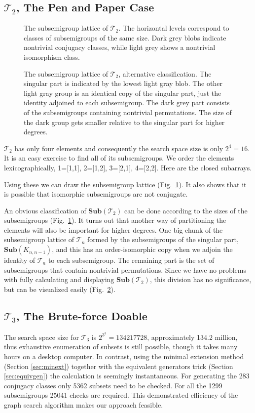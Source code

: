 \documentclass{amsart}
\newcommand{\cT}{{\mathcal T}}
\newcommand{\Sub}{\mathbf{Sub}}
\theoremstyle{plain}
\theoremstyle{definition}
\begin{document}
\subsection{$\cT_2$, The Pen and Paper Case}
\begin{figure}[t]

\caption{The subsemigroup lattice of $\cT_2$. The horizontal levels correspond to classes of subsemigroups of the same size.  Dark grey blobs indicate nontrivial conjugacy classes, while light grey shows a nontrivial isomorphism class.}
\label{fig:T2subs}
\end{figure}
\begin{figure}

\caption{The subsemigroup lattice of $\cT_2$, alternative classification. The singular part is indicated by the lowest light gray blob. The other light gray group is an identical copy of the singular part, just the identity adjoined to each subsemigroup. The dark grey part consists of the subsemigroups containing nontrivial permutations. The size of the dark group gets smaller relative to the singular part for higher degrees.}
\label{fig:T2subsAlt}
\end{figure}
$\cT_2$ has only four elements and consequently the search space size is only $2^4=16$.
It is an easy exercise to find all of its subsemigroups. 
We order the elements lexicographically, 1=[1,1], 2=[1,2], 3=[2,1], 4=[2,2]. Here are the closed subarrays.

Using these we can draw the subsemigroup lattice (Fig.\ \ref{fig:T2subs}).
It also shows that it is possible that isomorphic subsemigroups are not conjugate.

An obvious classification of $\Sub(\cT_2)$ can be done according to the sizes of the subsemigroups (Fig.\ \ref{fig:T2subs}).
It turns out that another way of partitioning the elements will also be important for higher degrees. 
One big chunk of the subsemigroup lattice of $\cT_n$ formed by the subsemigroups of the singular part, $\Sub(K_{n,n-1})$, and this has an order-isomorphic copy when we adjoin the identity of $\cT_n$ to each subsemigroup.
The remaining part is the set of subsemigroups that contain nontrivial permutations. 
Since we have no problems with fully calculating and displaying $\Sub(\cT_2)$, this division has no significance, but can be visualized easily (Fig.\ \ref{fig:T2subsAlt}).

\subsection{$\cT_3$, The Brute-force Doable}
The search space size for $\cT_3$ is $2^{3^3}=134217728$, approximately 134.2 million, thus exhaustive enumeration of subsets is still possible, though it takes many hours on a desktop computer.
In contrast, using the minimal extension method (Section \ref{sec:minext}) together with the equivalent generators trick (Section \ref{sec:equivgen}) the calculation is seemingly instantaneous.
For generating the 283 conjugacy classes only 5362 subsets need to be checked. For all the 1299 subsemigroups 25041 checks are required. This demonstrated efficiency of the graph search algorithm makes our approach feasible.
\end{document}
